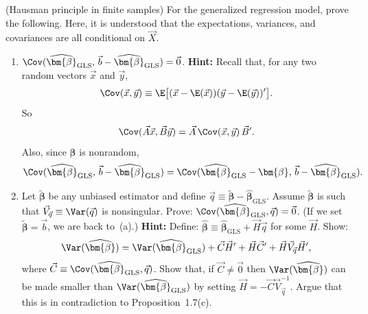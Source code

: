 \begin{problemset}
\exercise[7] (Hausman principle in finite samples)\quad
For the generalized regression model, prove the following. Here, it is
understood that the expectations, variances, and covariances are all
conditional on $\vec{X}$.

\begin{enumerate}[label=(\alph*)]
\item $\Cov(\widehat{\bm{\beta}}_{\text{GLS}},\,
\vec{b} - \widehat{\bm{\beta}}_{\text{GLS}}) = \vec{0}$.
\textbf{Hint:} Recall that, for any two random vectors $\vec{x}$ and
$\vec{y}$,
%
\[
\Cov(\vec{x}, \vec{y})
\equiv \E\bigl[(\vec{x} - \E(\vec{x}))(\vec{y} - \E(\vec{y}))'\bigr].
\]
%
So
%
\[
\Cov(\vec{A}\vec{x}, \vec{B}\vec{y}) = \vec{A}\,\Cov(\vec{x},\vec{y})\,\vec{B}'.
\]
%
Also, since $\bm{\beta}$ is nonrandom,
%
\[
\Cov(\widehat{\bm{\beta}}_{\text{GLS}},\,
\vec{b} - \widehat{\bm{\beta}}_{\text{GLS}})
= \Cov(\widehat{\bm{\beta}}_{\text{GLS}} - \bm{\beta},\,
\vec{b} - \widehat{\bm{\beta}}_{\text{GLS}}).
\]

\item Let $\widetilde{\bm{\beta}}$ be any unbiased estimator and define
$\vec{q} \equiv \widetilde{\bm{\beta}} - \widehat{\bm{\beta}}_{\text{GLS}}$.
Assume $\widetilde{\bm{\beta}}$ is such that
$\vec{V}_{\vec{q}} \equiv \Var(\vec{q})$ is nonsingular. Prove:
$\Cov(\widehat{\bm{\beta}}_{\text{GLS}}, \vec{q}) = \vec{0}$.
(If we set $\widetilde{\bm{\beta}} = \vec{b}$, we are back to~(a).)
\textbf{Hint:} Define:
$\widehat{\bm{\beta}} \equiv \widehat{\bm{\beta}}_{\text{GLS}}
+ \vec{H}\vec{q}$ for some $\vec{H}$. Show:
%
\[
\Var(\widehat{\bm{\beta}})
= \Var(\widehat{\bm{\beta}}_{\text{GLS}})
+ \vec{C}\vec{H}' + \vec{H}\vec{C}'
+ \vec{H}\vec{V}_{\vec{q}}\vec{H}',
\]
%
where $\vec{C} \equiv \Cov(\widehat{\bm{\beta}}_{\text{GLS}}, \vec{q})$.
Show that, if $\vec{C} \neq \vec{0}$ then $\Var(\widehat{\bm{\beta}})$ can
be made smaller than $\Var(\widehat{\bm{\beta}}_{\text{GLS}})$ by setting
$\vec{H} = -\vec{C}\vec{V}_{\vec{q}}^{-1}$. Argue that this is in
contradiction to Proposition~1.7(c).


\end{enumerate}
\end{problemset}
